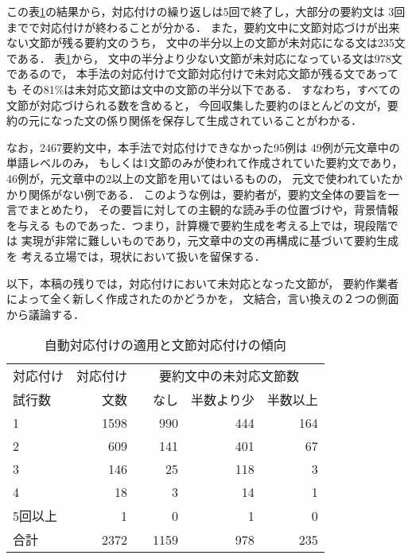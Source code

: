 この表\ref{del}の結果から，対応付けの繰り返しは5回で終了し，大部分の要約文は
3回までで対応付けが終わることが分かる．
また，要約文中に文節対応づけが出来ない文節が残る要約文のうち，
文中の半分以上の文節が未対応になる文は235文である．
表\ref{del}から，
文中の半分より少ない文節が未対応になっている文は978文であるので，
本手法の対応付けで文節対応付けで未対応文節が残る文であっても
その81\%は未対応文節は文中の文節の半分以下である．
すなわち，すべての文節が対応づけられる数を含めると，
今回収集した要約のほとんどの文が，要約の元になった文の係り関係を保存して生成されていることがわかる．

なお，2467要約文中，本手法で対応付けできなかった95例は
49例が元文章中の単語レベルのみ，
もしくは1文節のみが使われて作成されていた要約文であり，
46例が，元文章中の2以上の文節を用いてはいるものの，
元文で使われていたかかり関係がない例である．
このような例は，要約者が，要約文全体の要旨を一言でまとめたり，
その要旨に対しての主観的な読み手の位置づけや，背景情報を与える
ものであった．つまり，計算機で要約生成を考える上では，現段階では
実現が非常に難しいものであり，元文章中の文の再構成に基づいて要約生成を
考える立場では，現状において扱いを留保する．

以下，本稿の残りでは，対応付けにおいて未対応となった文節が，
要約作業者によって全く新しく作成されたのかどうかを，
文結合，言い換えの２つの側面から議論する．



\begin{table}
\caption{自動対応付けの適用と文節対応付けの傾向} 
\label{del}
\begin{center}
\begin{tabular}{|l|r|r|r|r|}
\hline
対応付け& 対応付け  &\multicolumn{3}{|c|}{要約文中の未対応文節数}     \\ \cline{3-5}
試行数  & 文数      &なし　  & 半数より少  &半数以上   \\ \hline \hline
 1      & 1598      & 990    &   444       &164\\
 2      & 609   & 141    & 401     &  67  \\
 3      & 146   &  25    & 118     &  3  \\
 4      & 18    &   3    & 14      &  1  \\
5回以上 & 1     &   0    &  1      &  0  \\ \hline
合計    & 2372  & 1159   & 978     & 235 \\ \hline
\end{tabular}
\end{center}
\end{table}



